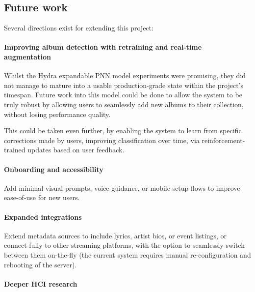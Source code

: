         
        \subsection{Future work}
          Several directions exist for extending this project:
    
          \paragraph{Improving album detection with retraining and real-time augmentation}
    
          Whilst the Hydra expandable PNN model experiments were promising, they did not manage to mature into a usable production-grade state within the project's timespan. Future work into this model could be done to allow the system to be truly robust by allowing users to seamlessly add new albums to their collection, without losing performance quality.
    
          This could be taken even further, by enabling the system to learn from specific corrections made by users, improving classification over time, via reinforcement-trained updates based on user feedback.
    
          \paragraph{Onboarding and accessibility}
    
          Add minimal visual prompts, voice guidance, or mobile setup flows to improve ease-of-use for new users.
    
          \paragraph{Expanded integrations}
    
          Extend metadata sources to include lyrics, artist bios, or event listings, or connect fully to other streaming platforms, with the option to seamlessly switch between them on-the-fly (the current system requires manual re-configuration and rebooting of the server).
    
          \paragraph{Deeper HCI research}
    

